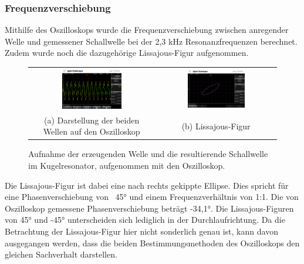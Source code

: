 \subsubsection{Frequenzverschiebung}

Mithilfe des Oszilloskops wurde die Frequenzverschiebung zwischen anregender Welle und gemessener Schallwelle bei der 2,3 kHz Resonanzfrequenzen berechnet. Zudem wurde noch die dazugehörige Lissajous-Figur aufgenommen.

\begin{figure}[H]
  \centering
  \begin{tabular}{cc}
  \includegraphics[width=0.5\textwidth]{Daten/Oszilloskop/scope_2.png} &   \includegraphics[width=0.5\textwidth]{Daten/Oszilloskop/scope_3.png} \\
  (a) Darstellung der beiden Wellen auf den Oszilloskop & (b) Lissajous-Figur  \\[6pt]
  \end{tabular}
  \caption{Aufnahme der erzeugenden Welle und die resultierende Schallwelle im Kugelresonator, aufgenommen mit den Oszilloskop.} 
  \label{fig:Phase_H}
\end{figure}

Die Lissajous-Figur ist dabei eine nach rechts gekippte Ellipse. Dies spricht für eine Phasenverschiebung von ~45° und einem Frequenzverhältnis von 1:1. Die von Oszilloskop gemessene Phasenverschiebung beträgt -34,1°. Die Lissajous-Figuren von 45° und -45° unterscheiden sich lediglich in der Durchlaufrichtung. Da die Betrachtung der Lissajous-Figur hier nicht sonderlich genau ist, kann davon ausgegangen werden, dass die beiden Bestimmungsmethoden des Oszilloskops den gleichen Sachverhalt darstellen.

